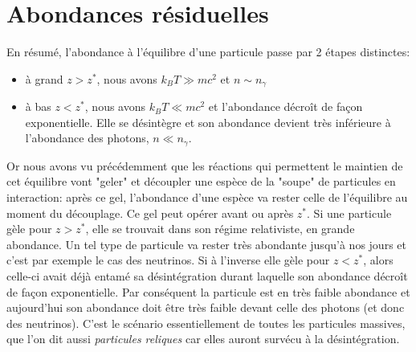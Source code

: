  \section{Abondances résiduelles}
  En résumé, l'abondance à l'équilibre d'une particule passe par 2 étapes distinctes:
 \begin{itemize}
 \item à grand $z>z^*$, nous avons $k_B T \gg mc^2$ et $n\sim n_\gamma$
 \item à bas  $z<z^*$, nous avons $k_B T \ll mc^2$ et l'abondance décroît de façon exponentielle. Elle se désintègre et son abondance devient très inférieure à l'abondance des photons, $n\ll n_\gamma$.
 \end{itemize}
Or nous avons vu précédemment que les réactions qui permettent le maintien de cet équilibre vont "geler" et découpler une espèce de la "soupe" de particules en interaction: après ce gel, l'abondance d'une espèce va rester celle de l'équilibre au moment du découplage. Ce gel peut opérer avant ou après $z^*$. Si une particule gèle pour $z>z^*$, elle se trouvait dans son régime relativiste, en grande abondance. Un tel type de particule va rester très abondante jusqu'à nos jours et c'est par exemple le cas des neutrinos. Si à l'inverse elle gèle pour $z<z^*$, alors celle-ci avait déjà entamé sa désintégration durant laquelle son abondance décroît de façon exponentielle. Par conséquent la particule est en très faible abondance et aujourd'hui son abondance doit être très faible devant celle des photons (et donc des neutrinos). C'est le scénario essentiellement de toutes les particules massives, que l'on dit aussi \textit{particules reliques} car elles auront survécu à la désintégration.
 